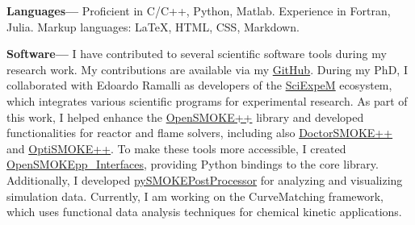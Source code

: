 {\bf Languages---}
Proficient in C/C++, Python, Matlab. Experience in Fortran, Julia. Markup
languages: \LaTeX, HTML, CSS, Markdown.


{\bf Software---}
I have contributed to several scientific software tools during my research work. My
contributions are available via my \href{https://github.com/tdinelli}{GitHub}. During my
PhD, I collaborated with Edoardo Ramalli as developers of the
\href{https://sciexpem.polimi.it/}{SciExpeM} ecosystem, which integrates various
scientific programs for experimental research. As part of this work, I helped enhance the
\href{https://www.opensmokepp.polimi.it/}{OpenSMOKE++} library and developed
functionalities for reactor and flame solvers, including also
\href{https://www.opensmokepp.polimi.it/}{DoctorSMOKE++} and
\href{https://github.com/burn-research/OptiSMOKE_toolbox}{OptiSMOKE++}. To make these
tools more accessible, I created
\href{https://github.com/tdinelli/OpenSMOKEpp_Interfaces}{OpenSMOKEpp\_Interfaces},
providing Python bindings to the core library. Additionally, I developed
\href{https://github.com/tdinelli/pySMOKEPostProcessor}{pySMOKEPostProcessor} for
analyzing and visualizing simulation data. Currently, I am working on the CurveMatching
framework, which uses functional data analysis techniques for chemical kinetic
applications.
